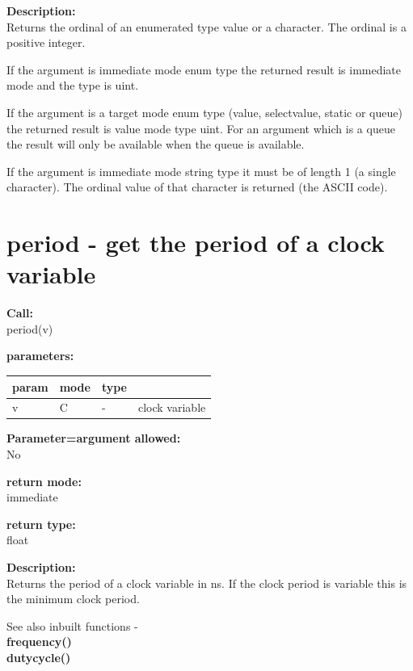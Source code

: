        {\bf Description:} \\
        Returns the ordinal of an enumerated type value or a character.
        The ordinal is a positive integer.
        
        If the argument is immediate mode enum type the returned result is
        immediate mode and the type is uint.
        
        If the argument is a target mode enum type (value, selectvalue, static or
        queue) the returned result is value mode type uint. For an argument which is
        a queue the result will only be available when the queue is available.
        
        If the argument is immediate mode string type it must be of length 1
        (a single character). The ordinal value of that character is returned
        (the ASCII code).


    \section{period - get the period of a clock variable}\label{sec:ifperiod}
        
        {\bf Call:} \\
        period(v)
        
        {\bf parameters:} \\
        \begin{tabular}{| l | l | l | l |}
        \hline
        param  & mode & type & \\
        \hline \hline
        v & C & - & clock variable \\ \hline
        \end{tabular}
        
        {\bf Parameter=argument allowed:} \\
        No
        
        {\bf return mode:} \\
        immediate

        {\bf return type:} \\
        float
        
        {\bf Description:} \\
        Returns the period of a clock variable in ns. If the clock period
        is variable this is the minimum clock period.
        
        See also inbuilt functions - \\
        {\bf frequency()}  \\
        {\bf dutycycle()} 





